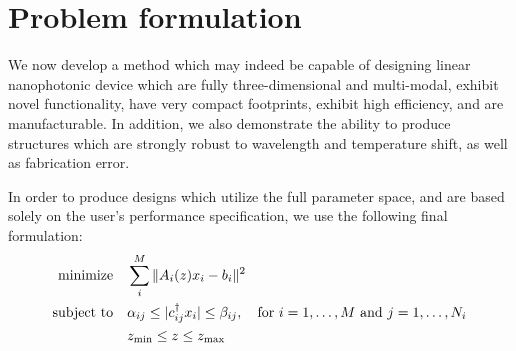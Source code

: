 \section{Problem formulation}
We now develop a method which may indeed be capable of designing 
    linear nanophotonic device which
    are fully three-dimensional and multi-modal,
    exhibit novel functionality,
    have very compact footprints,
    exhibit high efficiency, and
    are manufacturable.
In addition, we also demonstrate the ability to produce structures
    which are strongly robust to wavelength and temperature shift,
    as well as fabrication error.

In order to produce designs which utilize the full parameter space,
    and are based solely on the user's performance specification,
    we use the following final formulation:
\begin{subequations}\begin{align}
    \operatorname*{\text{minimize}\quad} & \sum_i^M \|A_i(z)x_i - b_i\|^2 \\
    \text{subject to}\quad & \alpha_{ij} \le |c_{ij}^\dagger x_i| \le \beta_{ij}, \quad
        \text{for $i = 1, \ldots, M$ and $j = 1, \ldots, N_i$} \\
        &   z_\text{min} \le z \le z_\text{max}
\end{align} \label{problem}\end{subequations}

